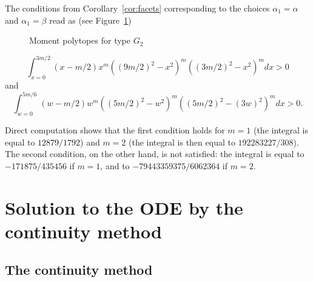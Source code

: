 \documentclass[10pt]{amsart}
\theoremstyle{plain}
\theoremstyle{definition}
\begin{document}
The conditions from Corollary~\ref{cor:facets} corresponding to the choices
$\alpha_1=\alpha$ and $\alpha_1=\beta$ read as (see Figure~\ref{fig:G2pol})
\begin{figure}
\smaller\centering
{}
\caption{Moment polytopes for type $G_2$}
\label{fig:G2pol}
\end{figure}
\begin{equation*}
\int_{x=0}^{3m/2}
(x-m/2)
x^m((9m/2)^2-x^2)^m((3m/2)^2-x^2)^m
dx
>0
\end{equation*}
and
\begin{equation*}
\int_{w=0}^{5m/6}
(w-m/2)
w^m((5m/2)^2-w^2)^m((5m/2)^2-(3w)^2)^m
dx
>0.
\end{equation*}

Direct computation shows that the first condition holds
for $m=1$ (the integral is equal to $12879/1792$)
and $m=2$ (the integral is then equal to $192283227/308$).
The second condition, on the other hand, is not satisfied:
the integral is equal to $-171875/435456$ if $m=1$, and
to $-79443359375/6062364$ if $m=2$.

\section{Solution to the ODE by the continuity method}
\label{sec:solut-ODE}

\subsection{The continuity method}
\end{document}
